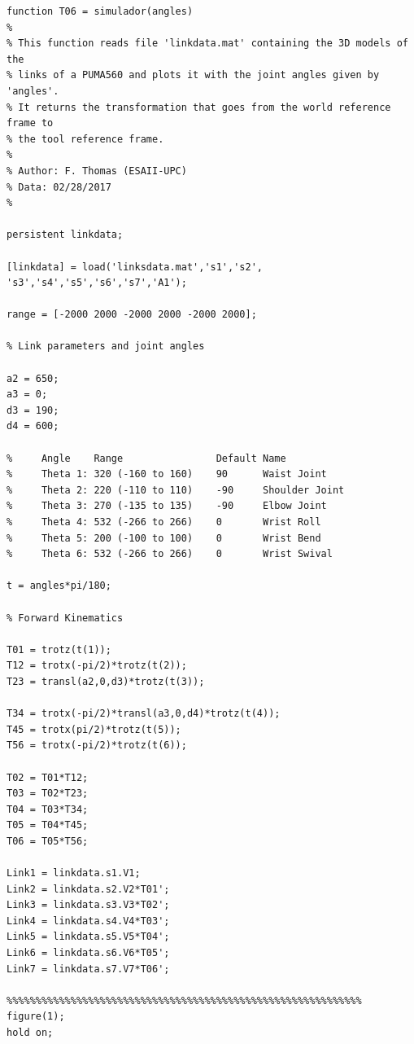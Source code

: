 \documentclass{article}
\begin{document}
\begin{lstlisting}[frame=single]
function T06 = simulador(angles)
%
% This function reads file 'linkdata.mat' containing the 3D models of the
% links of a PUMA560 and plots it with the joint angles given by 'angles'. 
% It returns the transformation that goes from the world reference frame to
% the tool reference frame.
%
% Author: F. Thomas (ESAII-UPC)
% Data: 02/28/2017
%
 
persistent linkdata;

[linkdata] = load('linksdata.mat','s1','s2', 's3','s4','s5','s6','s7','A1');

range = [-2000 2000 -2000 2000 -2000 2000];

% Link parameters and joint angles

a2 = 650;
a3 = 0;
d3 = 190;
d4 = 600;

%     Angle    Range                Default Name
%     Theta 1: 320 (-160 to 160)    90      Waist Joint
%     Theta 2: 220 (-110 to 110)    -90     Shoulder Joint
%     Theta 3: 270 (-135 to 135)    -90     Elbow Joint
%     Theta 4: 532 (-266 to 266)    0       Wrist Roll
%     Theta 5: 200 (-100 to 100)    0       Wrist Bend
%     Theta 6: 532 (-266 to 266)    0       Wrist Swival

t = angles*pi/180; 

% Forward Kinematics

T01 = trotz(t(1));
T12 = trotx(-pi/2)*trotz(t(2));
T23 = transl(a2,0,d3)*trotz(t(3));

T34 = trotx(-pi/2)*transl(a3,0,d4)*trotz(t(4));
T45 = trotx(pi/2)*trotz(t(5));
T56 = trotx(-pi/2)*trotz(t(6));

T02 = T01*T12;
T03 = T02*T23;
T04 = T03*T34;
T05 = T04*T45;
T06 = T05*T56;

Link1 = linkdata.s1.V1;
Link2 = linkdata.s2.V2*T01';
Link3 = linkdata.s3.V3*T02';
Link4 = linkdata.s4.V4*T03';
Link5 = linkdata.s5.V5*T04';
Link6 = linkdata.s6.V6*T05';
Link7 = linkdata.s7.V7*T06';

%%%%%%%%%%%%%%%%%%%%%%%%%%%%%%%%%%%%%%%%%%%%%%%%%%%%%%%%%%%%%
figure(1);
hold on;


\end{lstlisting}
\end{document}
